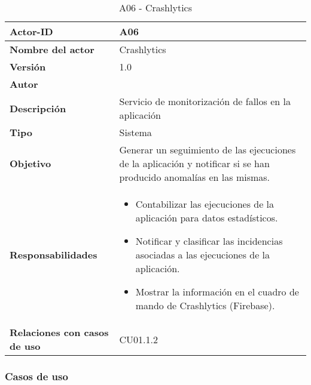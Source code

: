 \begin{table}[p]
	\centering
	\begin{tabularx}{\linewidth}{ p{} p{} }
		\toprule
		\textbf{Actor-ID}    & A06 \\
		\toprule
		\textbf{Nombre del actor} & Crashlytics \\
		\textbf{Versión}              & 1.0    \\
		\textbf{Autor}                & \autor \\
		\textbf{Descripción}          & Servicio de monitorización de fallos en la aplicación \\
		\textbf{Tipo}                 & Sistema \\
		\textbf{Objetivo}             & Generar un seguimiento de las ejecuciones de la aplicación y notificar si se han producido anomalías en las mismas.\\
		\textbf{Responsabilidades}    & 
		\begin{itemize}
			\tightlist
			\item Contabilizar las ejecuciones de la aplicación para datos estadísticos.
			\item Notificar y clasificar las incidencias asociadas a las ejecuciones de la aplicación.
			\item Mostrar la información en el cuadro de mando de Crashlytics (Firebase).
		\end{itemize}\\
		\textbf{Relaciones con casos de uso} & CU01.1.2 \\
		\bottomrule
	\end{tabularx}
	\caption{A06 - Crashlytics}
\end{table}

\subsubsection{Casos de uso}



